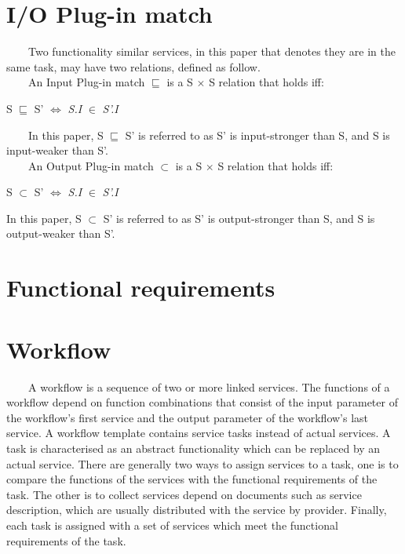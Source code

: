 \documentclass[senior,final,11pt]{iscs-thesis}
\begin{document}
\section{I/O Plug-in match}
~~~~Two functionality similar services, in this paper that denotes they are in the same task, may have two relations, defined as follow.\\
~~~~An Input Plug-in match $\sqsubseteq$ is a S $\times$ S relation that holds iff:
\begin{center}
S $\sqsubseteq$ S'  $\Leftrightarrow$ {\em S.I} $\in$ {\em S'.I}
\end{center}
~~~~In this paper, S $\sqsubseteq$ S' is referred to as S' is input-stronger than S, and S is input-weaker than S'.\\
~~~~An Output Plug-in match $\subset$ is a S $\times$ S relation that holds iff:
\begin{center}
S $\subset$ S' $\Leftrightarrow$ {\em S.I} $\in$ {\em S'.I}
\end{center}

In this paper, S $\subset$ S' is referred to as S' is output-stronger than S, and S is output-weaker than S'.\\

\section{Functional requirements}

\section{Workflow}
~~~~A workflow is a sequence of two or more linked services. The functions of a workflow depend on function combinations that consist of the input parameter of the workflow's first service and the output parameter of the workflow's last service. A workflow template contains service tasks instead of actual services. A task is characterised as an abstract functionality which can be replaced by an actual service. There are generally two ways to assign services to a task, one is to compare the functions of the services with the functional requirements of the task. The other is to collect services depend on documents such as service description, which are usually distributed with the service by provider. Finally, each task is assigned with a set of services which meet the functional requirements of the task.
\end{document}
